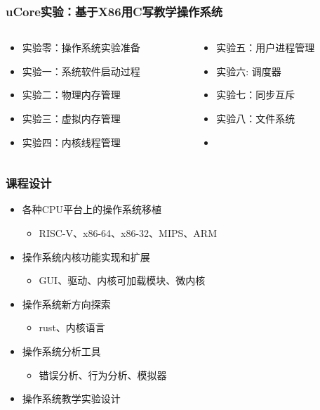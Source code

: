 \documentclass[UTF8]{ctexbeamer}
\begin{document}
\begin{frame}
\frametitle{uCore实验：基于X86用C写教学操作系统}
\begin{columns}
	
\begin{column}{0.5\textwidth}
\begin{itemize}
		\item 实验零：操作系统实验准备
		\item 实验一：系统软件启动过程
		\item 实验二：物理内存管理
		\item 实验三：虚拟内存管理
		\item 实验四：内核线程管理
\end{itemize}
\end{column}
 
\begin{column}{0.5\textwidth}
    \begin{itemize}
		\item 实验五：用户进程管理
		\item 实验六: 调度器
		\item 实验七：同步互斥
		\item 实验八：文件系统
		\item 
	\end{itemize}
\end{column}

\end{columns}

\end{frame}

\begin{frame}
\frametitle{课程设计}
	\begin{itemize}
	\item 各种CPU平台上的操作系统移植
		\begin{itemize}	
		\item RISC-V、x86-64、x86-32、MIPS、ARM
		\end{itemize}
	\item 操作系统内核功能实现和扩展
		\begin{itemize}	
		\item GUI、驱动、内核可加载模块、微内核
		\end{itemize}
	\item 操作系统新方向探索	
		\begin{itemize}	
		\item rust、内核语言
		\end{itemize}
	\item 操作系统分析工具	
		\begin{itemize}	
		\item 错误分析、行为分析、模拟器
		\end{itemize}
	\item 操作系统教学实验设计
	\end{itemize}
\end{frame}
    
\end{document}
